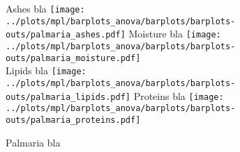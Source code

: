 
\begin{figure}[H]
\centering
	\subcaptionbox%
	{Ashes bla\label{subfig:palmaria_ashes}}%
		{\texttt{[image: ../plots/mpl/barplots\_anova/barplots/barplots-outs/palmaria\_ashes.pdf]}}%
\hfill
	\subcaptionbox%
	{Moisture bla\label{subfig:palmaria_moisture}}%
		{\texttt{[image: ../plots/mpl/barplots\_anova/barplots/barplots-outs/palmaria\_moisture.pdf]}}%
\\[2ex]
	\subcaptionbox%
	{Lipids bla\label{subfig:palmaria_lipids}}%
		{\texttt{[image: ../plots/mpl/barplots\_anova/barplots/barplots-outs/palmaria\_lipids.pdf]}}%
\hfill
	\subcaptionbox%
	{Proteins bla\label{subfig:palmaria_proteins}}%
		{\texttt{[image: ../plots/mpl/barplots\_anova/barplots/barplots-outs/palmaria\_proteins.pdf]}}%
\caption%
{Palmaria bla}
\label{fig:palmariabla}
\end{figure}
